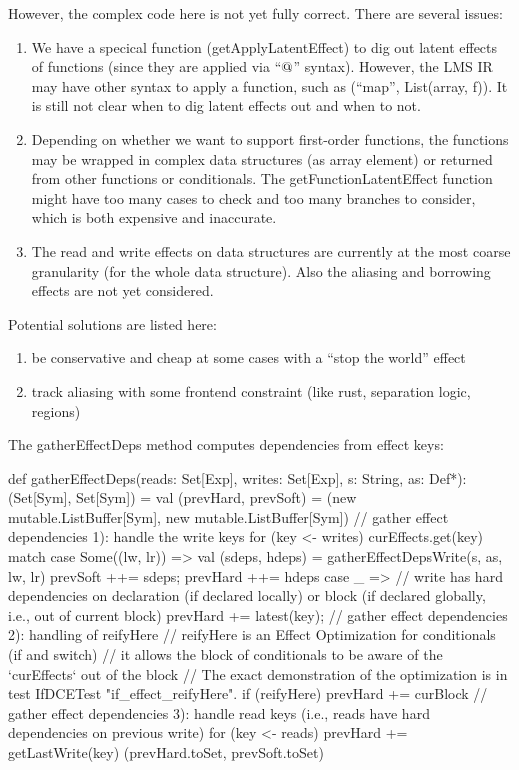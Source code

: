 However, the complex code here is not yet fully correct. There are several issues:
\begin{enumerate}
\item We have a specical function (getApplyLatentEffect) to dig out latent effects
      of functions (since they are applied via ``$@$'' syntax). However, the LMS IR may
      have other syntax to apply a function, such as (``map'', List(array, f)).
      It is still not clear when to dig latent effects out and when to not.
\item Depending on whether we want to support first-order functions, the functions
      may be wrapped in complex data structures (as array element) or returned from
      other functions or conditionals. The getFunctionLatentEffect function might have
      too many cases to check and too many branches to consider, which is both expensive
      and inaccurate.
\item The read and write effects on data structures are currently at the most coarse
      granularity (for the whole data structure). Also the aliasing and borrowing effects
      are not yet considered.
\end{enumerate}
Potential solutions are listed here:
\begin{enumerate}
\item be conservative and cheap at some cases with a ``stop the world'' effect
\item track aliasing with some frontend constraint (like rust, separation logic, regions)
\end{enumerate}

The gatherEffectDeps method computes dependencies from effect keys:

\begin{listing}[scala]
def gatherEffectDeps(reads: Set[Exp], writes: Set[Exp], s: String, as: Def*): (Set[Sym], Set[Sym]) = {
    val (prevHard, prevSoft) = (new mutable.ListBuffer[Sym], new mutable.ListBuffer[Sym])
    // gather effect dependencies 1): handle the write keys
    for (key <- writes) {
      curEffects.get(key) match {
        case Some((lw, lr)) =>
          val (sdeps, hdeps) = gatherEffectDepsWrite(s, as, lw, lr)
          prevSoft ++= sdeps; prevHard ++= hdeps
        case _ =>
          // write has hard dependencies on declaration (if declared locally) or block (if declared globally, i.e., out of current block)
          prevHard += latest(key);
      }
    }
    // gather effect dependencies 2): handling of reifyHere
    // reifyHere is an Effect Optimization for conditionals (if and switch)
    // it allows the block of conditionals to be aware of the `curEffects` out of the block
    // The exact demonstration of the optimization is in test IfDCETest "if_effect_reifyHere".
    if (reifyHere) prevHard += curBlock
    // gather effect dependencies 3): handle read keys (i.e., reads have hard dependencies on previous write)
    for (key <- reads) {
      prevHard += getLastWrite(key)
    }
    (prevHard.toSet, prevSoft.toSet)
}
\end{listing}

